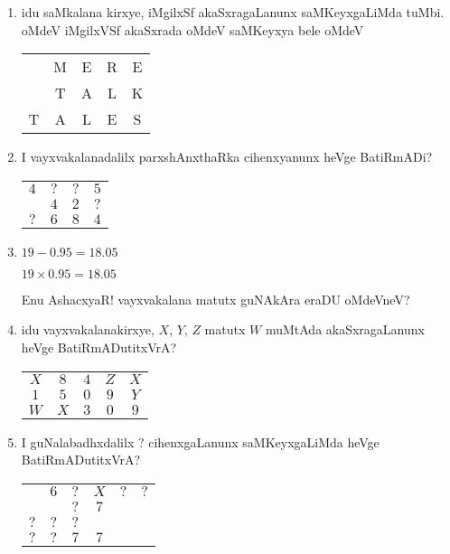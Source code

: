 \begin{enumerate}
\eject

\item idu saMkalana kirxye, iMgilxSf akaSxragaLanunx saMKeyxgaLiMda tuMbi. oMdeV iMgilxVSf akaSxrada oMdeV saMKeyxya bele oMdeV
\begin{center}
\begin{tabular}{ccccc}
 & {\rm M} & {\rm E} & {\rm R} & {\rm E}\\
 & {\rm T} & {\rm A} & {\rm L} & {\rm K}\\
\hline
{\rm T} & {\rm A} & {\rm L} & {\rm E} & {\rm S}
\end{tabular}
\end{center}

\item I vayxvakalanadalilx parxshAnxthaRka cihenxyanunx heVge BatiRmADi?
\begin{center}
\begin{tabular}{cccc}
$4$ & $?$ & $?$ & $5$\\
& $4$ & $2$ & $?$\\
\hline
$?$ & $6$ & $8$ & $4$
\end{tabular}
\end{center}

\item $19-0.95=18.05$

$19\times 0.95=18.05$

Enu AshacxyaR! vayxvakalana matutx guNAkAra eraDU oMdeVneV?

\item idu vayxvakalanakirxye, $X$, $Y$, $Z$ matutx $W$ muMtAda akaSxragaLanunx heVge BatiRmADutitxVrA?
\begin{center}
\begin{tabular}{ccccc}
$X$ & $8$ & $4$ & $Z$ & $X$\\
$1$ & $5$ & $0$ & $9$ & $Y$\\
\hline
$W$ & $X$ & $3$ & $0$ & $9$
\end{tabular}
\end{center}

\item I guNalabadhxdalilx $?$ cihenxgaLanunx saMKeyxgaLiMda heVge BatiRmADutitxVrA?
\begin{center}
\begin{tabular}{cccccc}
 & $6$ & $?$ & $X$ & $?$ & $?$\\
\cline{2-6}
& & $?$ & $7$ & & \\
$?$ & $?$ & $?$ &  & \\
\hline
$?$ & $?$ & $7$ & $7$ &&
\end{tabular}
\end{center}


\end{enumerate}
